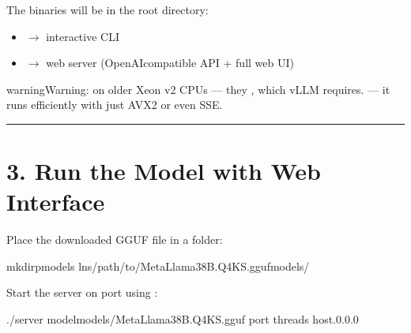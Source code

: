 \documentclass[letterpaper,10pt,english]{sphinxmanual}
\begin{document}
\sphinxAtStartPar
The binaries will be in the root directory:
\begin{itemize}
\item {} 
\sphinxAtStartPar
{} \(\rightarrow\) interactive CLI

\item {} 
\sphinxAtStartPar
{}   \(\rightarrow\) web server (OpenAI\sphinxhyphen{}compatible API + full web UI)

\end{itemize}

\begin{sphinxadmonition}{warning}{Warning:}
\sphinxAtStartPar
{} on older Xeon v2 CPUs — they , which vLLM requires.
 — it runs efficiently with just AVX2 or even SSE.
\end{sphinxadmonition}


\bigskip\hrule\bigskip



\section{3. Run the Model with Web Interface}
\label{\detokenize{llama-cpp:run-the-model-with-web-interface}}\label{\detokenize{llama-cpp:llama-cpp-run-the-model-with-web-interface}}
\sphinxAtStartPar
Place the downloaded GGUF file in a  folder:

\begin{sphinxVerbatim}[commandchars=\\\{\}]
mkdir\PYGZhy{}pmodels
ln\PYGZhy{}s/path/to/Meta\PYGZhy{}Llama\PYGZhy{}3\PYGZhy{}8B.Q4\PYGZus{}K\PYGZus{}S.ggufmodels/
\end{sphinxVerbatim}

\sphinxAtStartPar
Start the server on port  using :

\begin{sphinxVerbatim}[commandchars=\\\{\}]
./server
\PYGZhy{}\PYGZhy{}modelmodels/Meta\PYGZhy{}Llama\PYGZhy{}3\PYGZhy{}8B.Q4\PYGZus{}K\PYGZus{}S.gguf
\PYGZhy{}\PYGZhy{}port
\PYGZhy{}\PYGZhy{}threads
\PYGZhy{}\PYGZhy{}host.0.0.0
\end{sphinxVerbatim}
\end{document}
